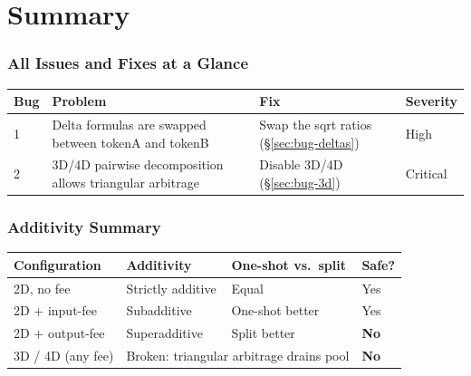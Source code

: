\documentclass[11pt]{article}
\theoremstyle{definition}
\begin{document}
\part{Summary}

\section{All Issues and Fixes at a Glance}

\begin{center}
\renewcommand{\arraystretch}{1.3}
\begin{tabular}{@{}p{1cm}p{4.5cm}p{4.5cm}l@{}}
\toprule
\textbf{Bug} & \textbf{Problem} & \textbf{Fix} & \textbf{Severity} \\
\midrule
1 & Delta formulas are swapped between tokenA and tokenB &
  Swap the sqrt ratios (\S\ref{sec:bug-deltas}) & High \\
2 & 3D/4D pairwise decomposition allows triangular arbitrage &
  Disable 3D/4D (\S\ref{sec:bug-3d}) & Critical \\
\bottomrule
\end{tabular}
\end{center}


\section{Additivity Summary}

\begin{center}
\renewcommand{\arraystretch}{1.3}
\begin{tabular}{@{}llll@{}}
\toprule
\textbf{Configuration} & \textbf{Additivity} & \textbf{One-shot vs.\ split} & \textbf{Safe?} \\
\midrule
2D, no fee & Strictly additive & Equal & Yes \\
2D + input-fee & Subadditive & One-shot better & Yes \\
2D + output-fee & Superadditive & Split better & \textbf{No} \\
\midrule
3D / 4D (any fee) & \multicolumn{2}{l}{Broken: triangular arbitrage drains pool} & \textbf{No} \\
\bottomrule
\end{tabular}
\end{center}
\end{document}
